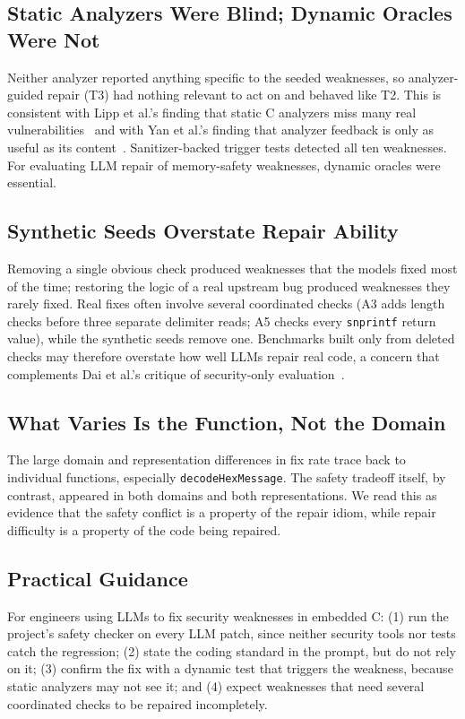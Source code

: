 \documentclass[12pt]{IEEEtran}
\begin{document}
\subsection{Static Analyzers Were Blind; Dynamic Oracles Were Not}
Neither analyzer reported anything specific to the seeded weaknesses, so analyzer-guided repair (T3) had nothing relevant to act on and behaved like T2. This is consistent with Lipp et al.'s finding that static C analyzers miss many real vulnerabilities~\cite{lipp2022static} and with Yan et al.'s finding that analyzer feedback is only as useful as its content~\cite{yan2025guiding}. Sanitizer-backed trigger tests detected all ten weaknesses. For evaluating LLM repair of memory-safety weaknesses, dynamic oracles were essential.

\subsection{Synthetic Seeds Overstate Repair Ability}
Removing a single obvious check produced weaknesses that the models fixed most of the time; restoring the logic of a real upstream bug produced weaknesses they rarely fixed. Real fixes often involve several coordinated checks (A3 adds length checks before three separate delimiter reads; A5 checks every \texttt{snprintf} return value), while the synthetic seeds remove one. Benchmarks built only from deleted checks may therefore overstate how well LLMs repair real code, a concern that complements Dai et al.'s critique of security-only evaluation~\cite{rethinking2026}.

\subsection{What Varies Is the Function, Not the Domain}
The large domain and representation differences in fix rate trace back to individual functions, especially \texttt{decodeHexMessage}. The safety tradeoff itself, by contrast, appeared in both domains and both representations. We read this as evidence that the safety conflict is a property of the repair idiom, while repair difficulty is a property of the code being repaired.

\subsection{Practical Guidance}
For engineers using LLMs to fix security weaknesses in embedded C: (1) run the project's safety checker on every LLM patch, since neither security tools nor tests catch the regression; (2) state the coding standard in the prompt, but do not rely on it; (3) confirm the fix with a dynamic test that triggers the weakness, because static analyzers may not see it; and (4) expect weaknesses that need several coordinated checks to be repaired incompletely.
\end{document}
